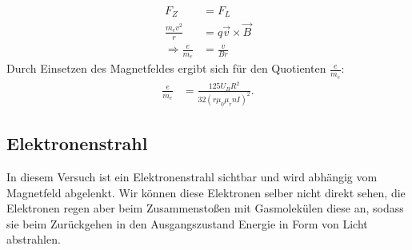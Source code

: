 \begin{align}
F_Z&=F_L \\
\frac{m_ev^2}{r}&=q\vec{v} \times \vec{B} \\
\Rightarrow \frac{e}{m_e}&=\frac{v}{Br}
\end{align}
Durch Einsetzen des Magnetfeldes ergibt sich für den Quotienten $\frac{e}{m_e}$:
\begin{align}
\frac{e}{m_e}&=\frac{125U_BR^2}{32\left(r\mu_0\mu_rnI\right)^2}\text{.}
\end{align}

\subsection{Elektronenstrahl}
In diesem Versuch ist ein Elektronenstrahl sichtbar und wird abhängig vom Magnetfeld abgelenkt. Wir können diese Elektronen selber nicht direkt sehen, die Elektronen regen aber beim Zusammenstoßen mit Gasmolekülen diese an, sodass sie beim Zurückgehen in den Ausgangszustand Energie in Form von Licht abstrahlen. 
